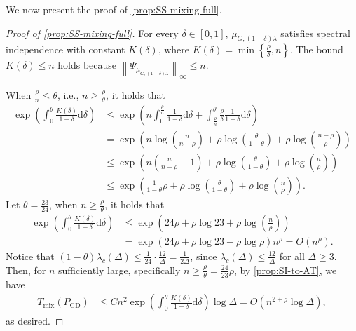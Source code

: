 \documentclass[11pt]{article}
\theoremstyle{plain}
\theoremstyle{definition}
\theoremstyle{remark}
\newcommand{\norm}[1]{\left\lVert #1 \right\rVert}
\newcommand{\set}[1]{\left\{#1\right\}}
\newcommand{\tuple}[1]{\left(#1\right)}
\newcommand{\tp}{\tuple}
\def\-#1{\mathrm{#1}} %
\begin{document}
We now present the proof of \cref{prop:SS-mixing-full}.
\begin{proof}[Proof of \cref{prop:SS-mixing-full}]
	For every $\delta \in [0,1]$, $\mu_{G,(1-\delta)\lambda}$ satisfies spectral independence with constant $K(\delta)$, where $K(\delta)=\min\set{\frac{\rho}{\delta},n}$.
    The bound $K(\delta)\leq n$ holds because $\norm{\Psi_{\mu_{G,(1-\delta)\lambda}}}_\infty\leq n$.
	
	\noindent When $\frac{\rho}{n}\leq \theta$, i.e., $n \geq \frac{\rho}{\theta}$, it holds that 
	\begin{align*}\label{eq:expSI}
		\exp\tp{\int_0^{\theta}\frac{K(\delta)}{1-\delta}\-d\delta}
		&\leq \exp\tp{n\int_0^{\frac{\rho}{n}}\frac{1}{1-\delta}\-d\delta
			+\int_{\frac{\rho}{n}}^{\theta}\frac{\rho}{\delta}\frac{1}{1-\delta}\-d\delta}\\
        &=\exp\tp{n\log\tp{\frac{n}{n-\rho}}+\rho\log\tp{\frac{\theta}{1-\theta}}+\rho\log\tp{\frac{n-\rho}{\rho}}}\\
        &\leq \exp\tp{n\tp{\frac{n}{n-\rho}-1}+\rho\log\tp{\frac{\theta}{1-\theta}}+\rho\log\tp{\frac{n}{\rho}}}\\
        &\leq \exp\tp{\frac{1}{1-\theta}\rho+\rho\log\tp{\frac{\theta}{1-\theta}}+\rho\log\tp{\frac{n}{\rho}}}.
    \end{align*}
	Let $\theta=\frac{23}{24}$, when $n \geq \frac{\rho}{\theta}$, it holds that 
	\begin{align*}
		\exp\tp{\int_0^{\theta}\frac{K(\delta)}{1-\delta}\-d\delta}
		&\leq \exp \tp{24 \rho+\rho\log 23+ \rho \log\tp{\frac{n}{\rho}}}\\
		&=\exp\tp{24 \rho+\rho\log 23-\rho\log \rho}n^{\rho}=O(n^{\rho}).
	\end{align*}
	Notice that $(1-\theta)\lambda_c(\Delta)\leq\frac{1}{24}\cdot\frac{12}{\Delta}=\frac{1}{2\Delta}$, since $\lambda_c(\Delta)\leq\frac{12}{\Delta}$ for all $\Delta\geq 3$. 
	Then, for $n$ sufficiently large, specifically $n \geq \frac{\rho}{\theta}=\frac{24}{23}\rho$, by \cref{prop:SI-to-AT}, we have
	\begin{align*}
		T_{\mathrm{mix}}(P_{\mathrm{GD}}) &\leq 
		Cn^2\exp\tp{\int_0^{\theta}\frac{K(\delta)}{1-\delta}\-d\delta}\log\Delta=O\tp{n^{2+\rho}\log\Delta},
	\end{align*}
	as desired.
\end{proof}
\end{document}
